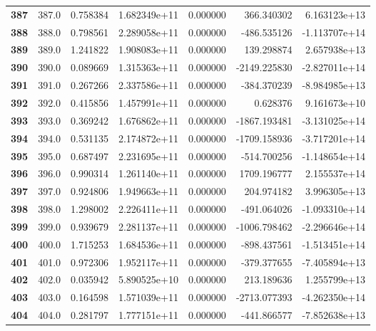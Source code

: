 \documentclass{report}[12pt]
\begin{document}
\begin{center}
\begin{tabular}{lrrrrrr}
\textbf{387 } &          387.0 &   0.758384 &  1.682349e+11 &    0.000000 &   366.340302 &  6.163123e+13 \\
\textbf{388 } &          388.0 &   0.798561 &  2.289058e+11 &    0.000000 &  -486.535126 & -1.113707e+14 \\
\textbf{389 } &          389.0 &   1.241822 &  1.908083e+11 &    0.000000 &   139.298874 &  2.657938e+13 \\
\textbf{390 } &          390.0 &   0.089669 &  1.315363e+11 &    0.000000 & -2149.225830 & -2.827011e+14 \\
\textbf{391 } &          391.0 &   0.267266 &  2.337586e+11 &    0.000000 &  -384.370239 & -8.984985e+13 \\
\textbf{392 } &          392.0 &   0.415856 &  1.457991e+11 &    0.000000 &     0.628376 &  9.161673e+10 \\
\textbf{393 } &          393.0 &   0.369242 &  1.676862e+11 &    0.000000 & -1867.193481 & -3.131025e+14 \\
\textbf{394 } &          394.0 &   0.531135 &  2.174872e+11 &    0.000000 & -1709.158936 & -3.717201e+14 \\
\textbf{395 } &          395.0 &   0.687497 &  2.231695e+11 &    0.000000 &  -514.700256 & -1.148654e+14 \\
\textbf{396 } &          396.0 &   0.990314 &  1.261140e+11 &    0.000000 &  1709.196777 &  2.155537e+14 \\
\textbf{397 } &          397.0 &   0.924806 &  1.949663e+11 &    0.000000 &   204.974182 &  3.996305e+13 \\
\textbf{398 } &          398.0 &   1.298002 &  2.226411e+11 &    0.000000 &  -491.064026 & -1.093310e+14 \\
\textbf{399 } &          399.0 &   0.939679 &  2.281137e+11 &    0.000000 & -1006.798462 & -2.296646e+14 \\
\textbf{400 } &          400.0 &   1.715253 &  1.684536e+11 &    0.000000 &  -898.437561 & -1.513451e+14 \\
\textbf{401 } &          401.0 &   0.972306 &  1.952117e+11 &    0.000000 &  -379.377655 & -7.405894e+13 \\
\textbf{402 } &          402.0 &   0.035942 &  5.890525e+10 &    0.000000 &   213.189636 &  1.255799e+13 \\
\textbf{403 } &          403.0 &   0.164598 &  1.571039e+11 &    0.000000 & -2713.077393 & -4.262350e+14 \\
\textbf{404 } &          404.0 &   0.281797 &  1.777151e+11 &    0.000000 &  -441.866577 & -7.852638e+13 \\

\end{tabular}
\end{center}
\end{document}
